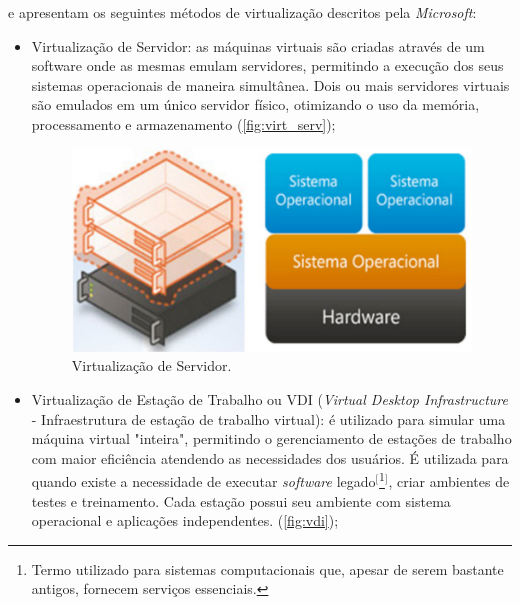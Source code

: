  e  apresentam os seguintes métodos de virtualização descritos pela \textit{Microsoft}:

\begin{itemize} 
    
    \item Virtualização de Servidor: as máquinas virtuais são criadas através de um software onde as mesmas emulam servidores, permitindo a execução dos seus sistemas operacionais de maneira simultânea. Dois ou mais servidores virtuais são emulados em um único servidor físico, otimizando o uso da memória, processamento e armazenamento (\autoref{fig:virt_serv});
           
    \begin{figure}[htb]
    	\caption{\label{fig:virt_serv}Virtualização de Servidor.}
    	\begin{center}
    	    \includegraphics[scale=0.29]{imagens/virtualizacao-servidor.jpg}
    	\end{center}
    \end{figure}
    
    \item Virtualização de Estação de Trabalho ou VDI (\textit{Virtual Desktop Infrastructure} - Infraestrutura de estação de trabalho virtual): é utilizado para simular uma máquina virtual "inteira", permitindo o gerenciamento de estações de trabalho com maior eficiência atendendo as necessidades dos usuários. É utilizada para quando existe a necessidade de executar \textit{software} legado$^{[}$\footnote{Termo utilizado para sistemas computacionais que, apesar de serem bastante antigos, fornecem serviços essenciais.}$^{]}$, criar ambientes de testes e treinamento. Cada estação possui seu ambiente com sistema operacional e aplicações independentes. (\autoref{fig:vdi});
    

\end{itemize}
